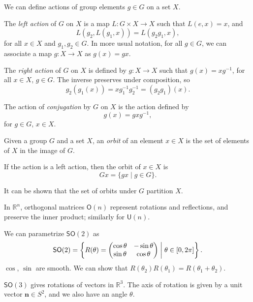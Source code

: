 \documentclass[12pt]{article}
\begin{document}
We can define actions of group elements $g \in G$ on a set $X$.

\begin{definition}
	The \emph{left action} of $G$ on $X$ is a map $L : G \times X \to X$ such that $L(e, x) = x$, and
	\[
	L(g_2, L(g_1, x)) = L(g_2 g_1, x),
	\]
	for all $x \in X$ and $g_1, g_2 \in G$. In more usual notation, for all $g \in G$, we can associate a map $g : X \to X$ as $g(x) = gx$.
\end{definition}

\begin{definition}
	The \emph{right action} of $G$ on $X$ is defined by $g : X \to X$ such that $g(x) = xg^{-1}$, for all $x \in X$, $g \in G$. The inverse preserves under composition, so
	\[
	g_2(g_1(x)) = x g_1^{-1} g_2^{-1} = (g_2 g_1)(x).
	\]
\end{definition}

\begin{definition}
	The action of \emph{conjugation} by $G$ on $X$ is the action defined by
	\[
	g(x) = g x g^{-1},
	\]
	for $g \in G$, $x \in X$.
\end{definition}

\begin{definition}
	Given a group $G$ and a set $X$, an \emph{orbit} of an element $x \in X$ is the set of elements of $X$ in the image of $G$.
\end{definition}

\begin{exbox}
	If the action is a left action, then the orbit of $x \in X$ is
	\[
		Gx = \{gx \mid g \in G\}.
	\]
\end{exbox}

It can be shown that the set of orbits under $G$ partition $X$.

In $\mathbb{R}^n$, orthogonal matrices $\mathsf{O}(n)$ represent rotations and reflections, and preserve the inner product; similarly for $\mathsf{U}(n)$.

We can parametrize $\mathsf{SO}(2)$ as
\[
\mathsf{SO}(2) = \left\{ R(\theta) =
	\begin{pmatrix}
		\cos \theta & - \sin \theta \\
		\sin \theta & \cos \theta
	\end{pmatrix}
	 \biggm|  \theta \in [0, 2\pi]\right\}.
\]
$\cos$, $\sin$ are smooth. We can show that $R(\theta_2)R(\theta_1) = R(\theta_1 + \theta_2)$.

$\mathsf{SO}(3)$ gives rotations of vectors in $\mathbb{R}^3$. The axis of rotation is given by a unit vector $\mathbf{n} \in S^2$, and we also have an angle $\theta$.
\end{document}
